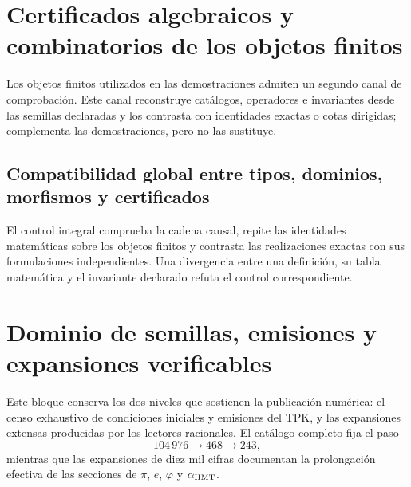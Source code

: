 
\chapter{Certificados algebraicos y combinatorios de los objetos finitos}
\label{app:infraestructura-reproducible-acumulativa}
\label{app:pruebas}

Los objetos finitos utilizados en las demostraciones admiten un segundo canal
de comprobación. Este canal reconstruye catálogos, operadores e invariantes
desde las semillas declaradas y los contrasta con identidades exactas o cotas
dirigidas; complementa las demostraciones, pero no las sustituye.

\HMTDemoteHeadings

\HMTRestoreHeadings

\section{Compatibilidad global entre tipos, dominios, morfismos y certificados}
\label{sec:ejecucion-integral-acumulativa}

El control integral comprueba la cadena causal, repite las identidades
matemáticas sobre los objetos finitos y contrasta las realizaciones exactas con
sus formulaciones independientes. Una divergencia entre una definición, su
tabla matemática y el invariante declarado refuta el control correspondiente.





\chapter{Dominio de semillas, emisiones y expansiones verificables}
\label{app:semillas-emisiones-expansiones-acumulativas}

Este bloque conserva los dos niveles que sostienen la publicación numérica:
el censo exhaustivo de condiciones iniciales y emisiones del TPK, y las
expansiones extensas producidas por los lectores racionales. El catálogo
completo fija el paso
\[
104\,976\longrightarrow468\longrightarrow243,
\]
mientras que las expansiones de diez mil cifras documentan la prolongación
efectiva de las secciones de \(\pi\), \(e\), \(\varphi\) y
\(\alpha_{\rm HMT}\).

